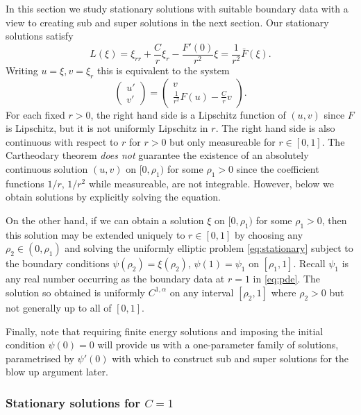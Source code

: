 \documentclass{amsart}
\begin{document}
In this section we study stationary solutions with suitable boundary data with a view to creating sub and super solutions in the next section. Our stationary solutions satisfy
\begin{equation}
\label{eq:stationary}
L(\xi) = \xi_{rr} + \frac{C}{r} \xi_r - \frac{F'(0)}{r^2} \xi = \frac{1}{r^2} \bar{F}(\xi).
\end{equation}
Writing \(u = \xi, v = \xi_r\) this is equivalent to the system
\[
\begin{pmatrix}
u' \\
v'
\end{pmatrix}
=
\begin{pmatrix}
v \\
\frac{1}{r^2} F(u) - \frac{C}{r} v
\end{pmatrix}.
\]
For each fixed \(r > 0\), the right hand side is a Lipschitz function of \((u,v)\) since \(F\) is Lipschitz, but it is not uniformly Lipschitz in \(r\). The right hand side is also continuous with respect to \(r\) for \(r > 0\) but only measureable for \(r \in [0, 1]\). The Cartheodary theorem \emph{does not} guarantee the existence of an absolutely continuous solution \((u, v)\) on \([0, \rho_1)\) for some  \(\rho_1 > 0\) since the coefficient functions \(1/r\), \(1/r^2\) while measureable, are not integrable. However, below we obtain solutions by explicitly solving the equation.

On the other hand, if we can obtain a solution \(\xi\) on \([0,\rho_1)\) for some \(\rho_1 > 0\), then this solution may be extended uniquely to \(r \in [0, 1]\) by choosing any \(\rho_2 \in (0, \rho_1)\) and solving the uniformly elliptic problem \eqref{eq:stationary} subject to the boundary conditions \(\psi(\rho_2) = \xi(\rho_2)\), \(\psi(1) = \psi_1\) on \([\rho_1, 1]\). Recall \(\psi_1\) is any real number occurring as the boundary data at \(r=1\) in \eqref{eq:pde}. The solution so obtained is uniformly \(C^{1,\alpha}\) on any interval \([\rho_2, 1]\) where \(\rho_2 > 0\) but not generally up to all of \([0, 1]\).

Finally, note that requiring finite energy solutions and imposing the initial condition \(\psi(0) = 0\) will provide us with a one-parameter family of solutions, parametrised by \(\psi'(0)\) with which to construct sub and super solutions for the blow up argument later.

\subsubsection*{Stationary solutions for \(C=1\)}
\end{document}
